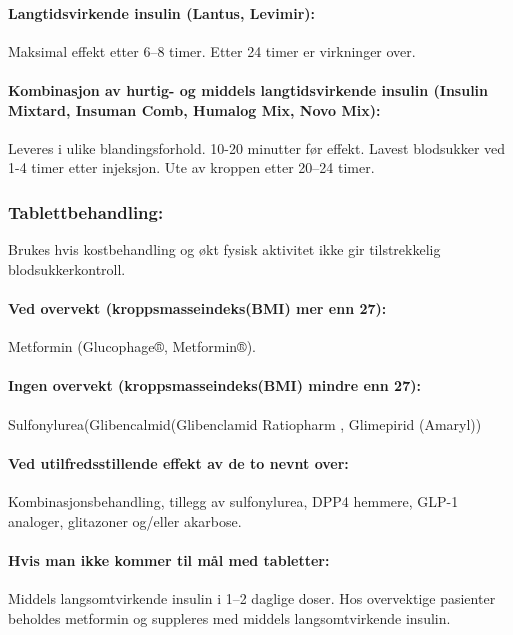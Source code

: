 					\paragraph{Langtidsvirkende insulin (Lantus\textregistered, Levimir\textregistered):\\}Maksimal effekt etter 6–8 timer. Etter 24 timer er virkninger over.

					\paragraph{Kombinasjon av hurtig- og middels langtidsvirkende insulin (Insulin Mixtard\textregistered, Insuman Comb\textregistered, Humalog Mix, Novo Mix):\\} Leveres i ulike blandingsforhold. 10-20 minutter før effekt. Lavest blodsukker ved 1-4 timer etter injeksjon. Ute av kroppen etter 20–24 timer.

				\subsubsection{Tablettbehandling:} 
					Brukes hvis kostbehandling og økt fysisk aktivitet ikke gir tilstrekkelig blodsukkerkontroll.

					\paragraph{Ved overvekt (kroppsmasseindeks(BMI) mer enn 27):\\}Metformin (Glucophage®, Metformin®).

					\paragraph{Ingen overvekt (kroppsmasseindeks(BMI) mindre enn 27):\\}Sulfonylurea(Glibencalmid(Glibenclamid Ratiopharm \textregistered, Glimepirid (Amaryl\textregistered))

					\paragraph{Ved utilfredsstillende effekt av de to nevnt over:\\}Kombinasjonsbehandling, tillegg av sulfonylurea, DPP4 hemmere, GLP-1 analoger, glitazoner og/eller akarbose.

					\paragraph{Hvis man ikke kommer til mål med tabletter:\\} Middels langsomtvirkende insulin i 1–2 daglige doser. Hos overvektige pasienter beholdes metformin og suppleres med middels langsomtvirkende insulin.

